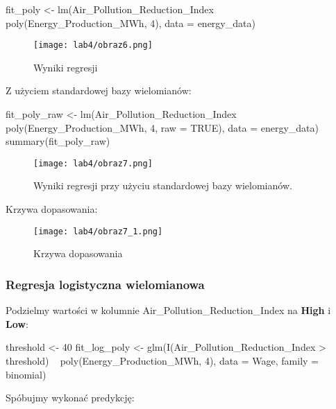 \begin{Rcode}
fit_poly <- lm(Air_Pollution_Reduction_Index ~ poly(Energy_Production_MWh, 4), data = energy_data)
\end{Rcode}

\begin{figure}[H]
    \centering
    \texttt{[image: lab4/obraz6.png]}
    \caption{Wyniki regresji}
    \label{fig:enter-label}
\end{figure}

Z użyciem standardowej bazy wielomianów:
\begin{Rcode}
fit_poly_raw <- lm(Air_Pollution_Reduction_Index ~ poly(Energy_Production_MWh, 4, raw = TRUE), data = energy_data)
summary(fit_poly_raw)
\end{Rcode}

\begin{figure}[H]
    \centering
    \texttt{[image: lab4/obraz7.png]}
    \caption{Wyniki regresji przy użyciu standardowej bazy wielomianów.}
    \label{fig:enter-label}
\end{figure}

Krzywa dopasowania:

\begin{figure}[H]
    \centering
    \texttt{[image: lab4/obraz7\_1.png]}
    \caption{Krzywa dopasowania}
    \label{fig:enter-label}
\end{figure}

\subsubsection{Regresja logistyczna wielomianowa}
Podzielmy wartości w kolumnie Air\_Pollution\_Reduction\_Index na \textbf{High} i \textbf{Low}:

\begin{Rcode}
threshold <- 40
fit_log_poly <- glm(I(Air_Pollution_Reduction_Index > threshold) ~ poly(Energy_Production_MWh, 4), data = Wage, family = binomial)
\end{Rcode}

Spóbujmy wykonać predykcję:


